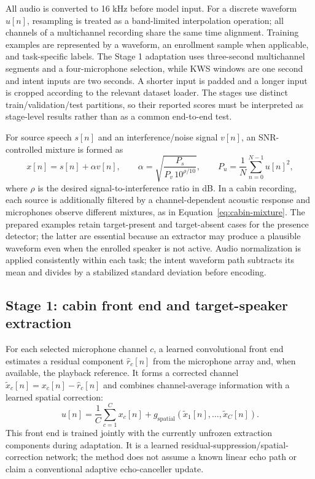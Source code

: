 All audio is converted to 16 kHz before model input. For a discrete waveform $u[n]$, resampling is treated as a band-limited interpolation operation; all channels of a multichannel recording share the same time alignment. Training examples are represented by a waveform, an enrollment sample when applicable, and task-specific labels. The Stage 1 adaptation uses three-second multichannel segments and a four-microphone selection, while KWS windows are one second and intent inputs are two seconds. A shorter input is padded and a longer input is cropped according to the relevant dataset loader. The stages use distinct train/validation/test partitions, so their reported scores must be interpreted as stage-level results rather than as a common end-to-end test.

For source speech $s[n]$ and an interference/noise signal $v[n]$, an SNR-controlled mixture is formed as
\begin{equation}
  x[n]=s[n]+\alpha v[n],\qquad
  \alpha=\sqrt{\frac{P_s}{P_v\,10^{\rho/10}}},\qquad
  P_u=\frac{1}{N}\sum_{n=0}^{N-1}u[n]^2,
  \label{eq:method-mixing}
\end{equation}
where $\rho$ is the desired signal-to-interference ratio in dB. In a cabin recording, each source is additionally filtered by a channel-dependent acoustic response and microphones observe different mixtures, as in Equation~\eqref{eq:cabin-mixture}. The prepared examples retain target-present and target-absent cases for the presence detector; the latter are essential because an extractor may produce a plausible waveform even when the enrolled speaker is not active. Audio normalization is applied consistently within each task; the intent waveform path subtracts its mean and divides by a stabilized standard deviation before encoding.

\subsection{Stage 1: cabin front end and target-speaker extraction}
\label{subsec:method-stage1}

For each selected microphone channel $c$, a learned convolutional front end estimates a residual component $\hat{r}_c[n]$ from the microphone array and, when available, the playback reference. It forms a corrected channel $\tilde{x}_c[n]=x_c[n]-\hat{r}_c[n]$ and combines channel-average information with a learned spatial correction:
\begin{equation}
  u[n]=\frac{1}{C}\sum_{c=1}^{C}x_c[n]
      +g_{\mathrm{spatial}}(\tilde{x}_1[n],\ldots,\tilde{x}_C[n]).
  \label{eq:method-front-end}
\end{equation}
This front end is trained jointly with the currently unfrozen extraction components during adaptation. It is a learned residual-suppression/spatial-correction network; the method does not assume a known linear echo path or claim a conventional adaptive echo-canceller update.

